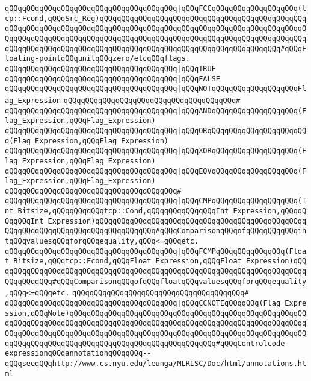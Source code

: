 \verb|qQQqqQQqqQQqqQQqqQQqqQQqqQQqqQQqqQQqqQQq|\verb#|qQQqFCCqQQqqQQqqQQqqQQqqQQq(tcp::Fcond,qQQqSrc_Reg)qQQqqQQqqQQqqQQqqQQqqQQqqQQqqQQqqQQqqQQqqQQqqQQqqQQqqQQqqQQqqQQqqQQqqQQqqQQqqQQqqQQqqQQqqQQqqQQqqQQqqQQqqQQqqQQqqQQqqQQqqQQqqQQqqQQqqQQqqQQqqQQqqQQqqQQqqQQqqQQqqQQqqQQqqQQqqQQqqQQqqQQqqQQqqQQqqQQqqQQqqQQqqQQqqQQqqQQqqQQqqQQqqQQqqQQqqQQqqQQqqQQqqQQqqQQq#\verb|#qQQqFloating-pointqQQqunitqQQqzero/etcqQQqflags.|\newline
\verb|qQQqqQQqqQQqqQQqqQQqqQQqqQQqqQQqqQQqqQQq|\verb#|qQQqTRUE#\newline
\verb|qQQqqQQqqQQqqQQqqQQqqQQqqQQqqQQqqQQqqQQq|\verb#|qQQqFALSE#\newline
\verb|qQQqqQQqqQQqqQQqqQQqqQQqqQQqqQQqqQQqqQQq|\verb#|qQQqNOTqQQqqQQqqQQqqQQqqQQqFlag_Expression#\newline
\verb|qQQqqQQqqQQqqQQqqQQqqQQqqQQqqQQqqQQqqQQq#|\newline
\verb|qQQqqQQqqQQqqQQqqQQqqQQqqQQqqQQqqQQqqQQq|\verb#|qQQqANDqQQqqQQqqQQqqQQqqQQq(Flag_Expression,qQQqFlag_Expression)#\newline
\verb|qQQqqQQqqQQqqQQqqQQqqQQqqQQqqQQqqQQqqQQq|\verb#|qQQqORqQQqqQQqqQQqqQQqqQQqqQQq(Flag_Expression,qQQqFlag_Expression)#\newline
\verb|qQQqqQQqqQQqqQQqqQQqqQQqqQQqqQQqqQQqqQQq|\verb#|qQQqXORqQQqqQQqqQQqqQQqqQQq(Flag_Expression,qQQqFlag_Expression)#\newline
\verb|qQQqqQQqqQQqqQQqqQQqqQQqqQQqqQQqqQQqqQQq|\verb#|qQQqEQVqQQqqQQqqQQqqQQqqQQq(Flag_Expression,qQQqFlag_Expression)#\newline
\verb|qQQqqQQqqQQqqQQqqQQqqQQqqQQqqQQqqQQqqQQq#|\newline
\verb|qQQqqQQqqQQqqQQqqQQqqQQqqQQqqQQqqQQqqQQq|\verb#|qQQqCMPqQQqqQQqqQQqqQQqqQQq(Int_Bitsize,qQQqqQQqqQQqtcp::Cond,qQQqqQQqqQQqqQQqInt_Expression,qQQqqQQqqQQqInt_Expression)qQQqqQQqqQQqqQQqqQQqqQQqqQQqqQQqqQQqqQQqqQQqqQQqqQQqqQQqqQQqqQQqqQQqqQQqqQQqqQQqqQQq#\verb|#qQQqComparisonqQQqofqQQqqQQqqQQqintqQQqvaluesqQQqforqQQqequality,qQQq<=qQQqetc.|\newline
\verb|qQQqqQQqqQQqqQQqqQQqqQQqqQQqqQQqqQQqqQQq|\verb#|qQQqFCMPqQQqqQQqqQQqqQQq(Float_Bitsize,qQQqtcp::Fcond,qQQqFloat_Expression,qQQqFloat_Expression)qQQqqQQqqQQqqQQqqQQqqQQqqQQqqQQqqQQqqQQqqQQqqQQqqQQqqQQqqQQqqQQqqQQqqQQqqQQqqQQqqQQq#\verb|#qQQqComparisonqQQqofqQQqfloatqQQqvaluesqQQqforqQQqequality,qQQq<=qQQqetc.|\newline
\verb|qQQqqQQqqQQqqQQqqQQqqQQqqQQqqQQqqQQqqQQq#|\newline
\verb|qQQqqQQqqQQqqQQqqQQqqQQqqQQqqQQqqQQqqQQq|\verb#|qQQqCCNOTEqQQqqQQq(Flag_Expression,qQQqNote)qQQqqQQqqQQqqQQqqQQqqQQqqQQqqQQqqQQqqQQqqQQqqQQqqQQqqQQqqQQqqQQqqQQqqQQqqQQqqQQqqQQqqQQqqQQqqQQqqQQqqQQqqQQqqQQqqQQqqQQqqQQqqQQqqQQqqQQqqQQqqQQqqQQqqQQqqQQqqQQqqQQqqQQqqQQqqQQqqQQqqQQqqQQqqQQqqQQqqQQqqQQqqQQqqQQqqQQqqQQqqQQqqQQqqQQqqQQqqQQqqQQq#\verb|#qQQqControlcode-expressionqQQqannotationqQQqqQQq--qQQqseeqQQqhttp://www.cs.nyu.edu/leunga/MLRISC/Doc/html/annotations.html|\newline
